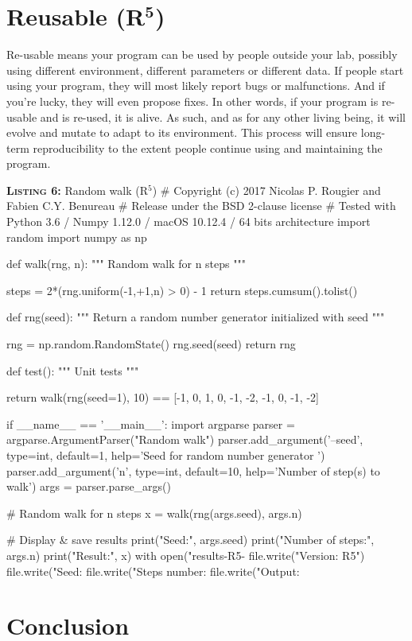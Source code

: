 \clearpage
\section*{Reusable (R$^{\mathbf 5}$)}

Re-usable means your program can be used by people outside your lab,
possibly using different environment, different parameters or different data.
If people start using your program,
they will most likely report bugs or malfunctions.
And if you're lucky, they will even propose fixes.
In other words, if your program is re-usable and is re-used, it is alive.
As such, and as for any other living being,
it will evolve and mutate to adapt to its environment.
This process will ensure long-term reproducibility
to the extent people continue using and maintaining the program.


\begin{code}{\textbf{\textsc{Listing 6:}} Random walk (R$^5$)}
# Copyright (c) 2017 Nicolas P. Rougier and Fabien C.Y. Benureau
# Release under the BSD 2-clause license
# Tested with Python 3.6 / Numpy 1.12.0 / macOS 10.12.4 / 64 bits architecture
import random
import numpy as np

def walk(rng, n):
    """ Random walk for n steps """

    steps = 2*(rng.uniform(-1,+1,n) > 0) - 1
    return steps.cumsum().tolist()

def rng(seed):
    """ Return a random number generator initialized with seed """ 
    
    rng = np.random.RandomState()
	rng.seed(seed)
    return rng

def test():
    """ Unit tests """

    return walk(rng(seed=1), 10) == [-1, 0, 1, 0, -1, -2, -1, 0, -1, -2]

if __name__ == '__main__':
    import argparse
    parser = argparse.ArgumentParser("Random walk")
    parser.add_argument('--seed', type=int, default=1,
                        help='Seed for random number generator ')
    parser.add_argument('n', type=int, default=10,
                        help='Number of step(s) to walk')
    args = parser.parse_args()

    # Random walk for n steps
    x = walk(rng(args.seed), args.n)

    # Display & save results
    print("Seed:", args.seed)
    print("Number of steps:", args.n)
    print("Result:",  x)
    with open("results-R5-%
        file.write("Version: R5")
        file.write("Seed: %
        file.write("Steps number: %
        file.write("Output: %
\end{code}




\clearpage
\section*{Conclusion}


\renewcommand*{\bibfont}{\small}
\printbibliography[title=References]




